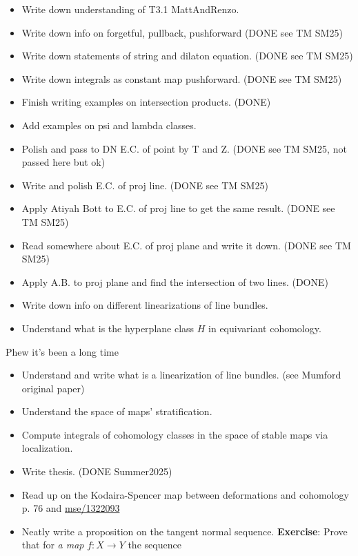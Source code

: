 \documentclass[12pt]{memoir}
\begin{document}
{\begin{itemize}
    \item Write down understanding of T3.1 MattAndRenzo.
    \item Write down info on forgetful, pullback, pushforward (DONE see TM SM25)
    \item Write down statements of string and dilaton equation. (DONE see TM SM25)
    \item Write down integrals as constant map pushforward. (DONE see TM SM25)
\end{itemize}
\begin{itemize}
    \item Finish writing examples on intersection products. (DONE)
    \item Add examples on psi and lambda classes.
    \item Polish and pass to DN E.C. of point by T and Z. (DONE see TM SM25, not passed here but ok)
    \item Write and polish E.C. of proj line. (DONE see TM SM25)
    \item Apply Atiyah Bott to E.C. of proj line to get the same result. (DONE see TM SM25)
    \item Read somewhere about E.C. of proj plane and write it down. (DONE see TM SM25)
    \item Apply A.B. to proj plane and find the intersection of two lines. (DONE)
    \item Write down info on different linearizations of line bundles.
    \item Understand what is the hyperplane class \(H\) in equivariant cohomology.
\end{itemize}
Phew it's been a long time
\begin{itemize}
    \item Understand and write what is a linearization of line bundles. (see Mumford original paper)
    \item Understand the space of maps' stratification.
    \item Compute integrals of cohomology classes in the space of stable maps via localization.
    \item Write thesis. (DONE Summer2025)
\end{itemize}
\begin{itemize}
    \item Read up on the Kodaira-Spencer map between deformations and cohomology \cite{GreenBookKockVainsencher} p. 76 and \href{https://math.stackexchange.com/questions/1322093/why-does-infinitesimal-lifting-imply-triviality-of-infinitesimal-deformations/1322196#1322196}{mse/1322093}
\end{itemize}
\begin{itemize}
    \item Neatly write a proposition on the tangent normal sequence. \textbf{Exercise}: Prove that for \emph{a map} \(f:X\to Y\) the sequence


\end{itemize}}
\end{document}

